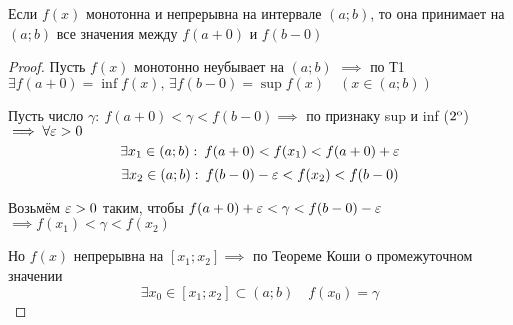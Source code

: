 \begin{theorem}
    Если $f(x)$ монотонна и непрерывна на интервале $(a; b)$, то она принимает на $(a; b)$
    все значения между $f(a + 0)$ и $f(b - 0)$
\end{theorem}
\begin{proof}
    Пусть $f(x)$ монотонно неубывает на $(a; b)$ $\implies$
    по Т1 $\exists f(a + 0) = \inf f(x), \, \exists f(b - 0) = \sup f(x) \quad (x \in (a; b))$

    Пусть число $\gamma:\: f(a + 0) < \gamma < f(b - 0) \implies$ по признаку sup и inf ($2^{\text{o}}$)
    $\implies \forall \varepsilon > 0$
    \[ \exists x_1 \in (a; b): \: f(a + 0) < f(x_1) < f(a + 0) + \varepsilon \]
    \[ \exists x_2 \in (a; b): \: f(b - 0) - \varepsilon < f(x_2) < f(b - 0) \]

    Возьмём $\varepsilon > 0$ таким, чтобы $f(a + 0) + \varepsilon < \gamma < f(b - 0) - \varepsilon$
    $\implies f(x_1) < \gamma < f(x_2)$

    Но $f(x)$ непрерывна на $[x_1; x_2] \implies$ по Теореме Коши о промежуточном значении
    \[ \exists x_0 \in [x_1; x_2] \subset (a; b) \quad f(x_0) = \gamma \]
\end{proof}

